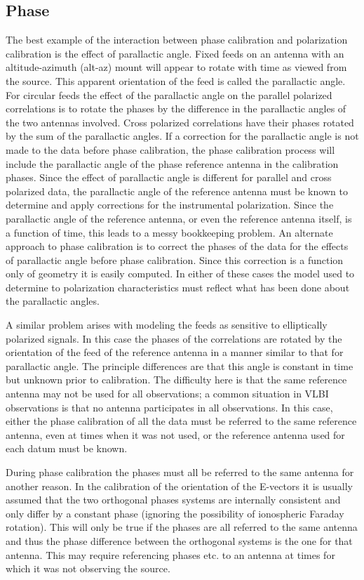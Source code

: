 \subsection {Phase}
   The best example of the interaction between phase calibration and
polarization calibration is the effect of parallactic angle.  Fixed
feeds on an antenna with an altitude-azimuth (alt-az) mount will
appear to rotate with time as viewed from the source.  This apparent
orientation of the feed is called the parallactic angle.  For circular
feeds the effect of the parallactic angle on the parallel polarized
correlations is to rotate the phases by the difference in the
parallactic angles of the two antennas involved.  Cross polarized
correlations have their phases rotated by the sum of the parallactic
angles.  If a correction for the parallactic angle is not made to the
data before phase calibration, the phase calibration process will
include the parallactic angle of the phase reference antenna in the
calibration phases.  Since the effect of parallactic angle is different for
parallel and cross polarized data, the parallactic angle of the
reference antenna must be known to determine and apply corrections for
the instrumental polarization. Since the parallactic angle of the
reference antenna, or even the reference antenna itself, is a function
of time, this leads to a messy bookkeeping problem.  An alternate
approach to phase calibration is to correct the phases of the data for
the effects of parallactic angle before phase calibration.  Since this
correction is a function only of geometry it is easily computed.  In
either of these cases the model used to determine to polarization
characteristics must reflect what has been done about the parallactic
angles.

   A similar problem arises with modeling the feeds as sensitive to
elliptically polarized signals.  In this case the phases of the
correlations are rotated by the orientation of the feed of the
reference antenna in a manner similar to that for parallactic angle.
The principle differences are that this angle is constant in time but
unknown prior to calibration.  The difficulty here is that the
same reference antenna may not be used for all observations; a common
situation in VLBI observations is that no antenna
participates in all observations.  In this case, either the phase
calibration of all the data must be referred to the same reference
antenna, even at times when it was not used, or the reference antenna
used for each datum must be known.

   During phase calibration the phases must all be referred
to the same antenna for another reason.  In the calibration of the
orientation of the E-vectors it is usually assumed that the two
orthogonal phases systems are internally consistent and only differ by
a constant phase (ignoring the possibility of ionospheric Faraday
rotation).  This will only be true if the phases are all referred to
the same antenna and thus the phase difference between the orthogonal
systems is the one for that antenna.  This may require referencing
phases etc. to an antenna at times for which it was not observing the
source.

